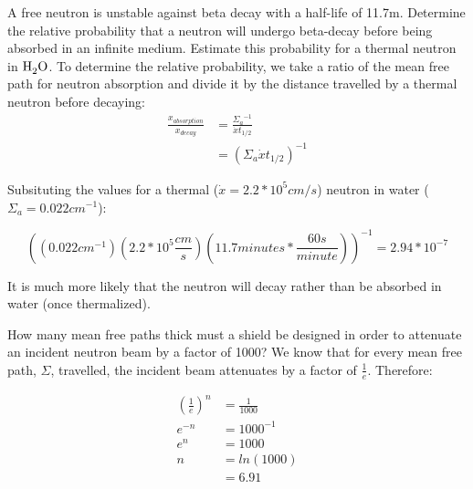 \documentclass{hw}
\begin{document}
	A free neutron is unstable against beta decay with a half-life of 11.7m. Determine the relative probability that a neutron will undergo beta-decay before being absorbed in an infinite medium. Estimate this probability for a thermal neutron in $ \ce{H_{2}O} $.
\solution
	To determine the relative probability, we take a ratio of the mean free path for neutron absorption and divide it by the distance travelled by a thermal neutron before decaying:
	\begin{align*}
		\frac{x_{absorption}}{x_{decay}} 
		&= \frac{{\Sigma_a}^{-1}}{\dot{x} t_{1/2}}\\
		&= \left({\Sigma_a \dot{x} t_{1/2}}\right)^{-1}
	\end{align*}

	Subsituting the values for a thermal ($ \dot{x} = 2.2*10^5 cm/s $) neutron in water ($ \Sigma_a = 0.022 cm^{-1} $):

	\[
		\left( \left( 0.022 cm^{-1} \right)\left( 2.2*10^{5} \frac{cm}{s} \right)\left( 11.7 minutes * \frac{60s}{minute} \right) \right)^{-1}
		= 2.94 * 10^{-7}
	\]

	It is much more likely that the neutron will decay rather than be absorbed in water (once thermalized). 

	How many mean free paths thick must a shield be designed in order to attenuate an incident neutron beam by a factor of 1000?
\solution
	We know that for every mean free path, $ \Sigma $, travelled, the incident beam attenuates by a factor of $ \frac{1}{e} $. Therefore:
	
	\begin{align*}
		\left(\frac{1}{e}\right)^n &= \frac{1}{1000} \\
		e^{-n} &= 1000^{-1} \\
		e^n &= 1000 \\
		n &= ln(1000) \\
		&= 6.91
	\end{align*}
\end{document}
